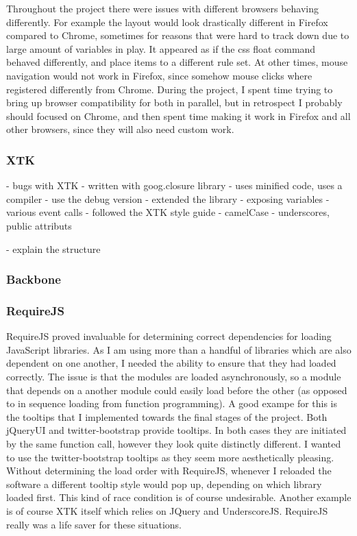 \documentclass[a4paper,11pt,titlepage]{article}
\begin{document}
Throughout the project there were issues with different browsers behaving differently. For example the layout would look drastically different in Firefox compared to Chrome, sometimes for reasons that were hard to track down due to large amount of variables in play. It appeared as if the css float command behaved differently, and place items to a different rule set. At other times, mouse navigation would not work in Firefox, since somehow mouse clicks where registered differently from Chrome. During the project, I spent time trying to bring up browser compatibility for both in parallel, but in retrospect I probably should focused on Chrome, and then spent time making it work in Firefox and all other browsers, since they will also need custom work.



\subsubsection{XTK}

- bugs with XTK
- written with goog.closure library
	- uses minified code, uses a compiler
	- use the debug version
- extended the library
- exposing variables
- various event calls
- followed the XTK style guide
	- camelCase
	- underscores, public attributs

- explain the structure




\subsubsection{Backbone}



\subsubsection{RequireJS}

RequireJS proved invaluable for determining correct dependencies for loading JavaScript libraries.
As I am using more than a handful of libraries which are also dependent on one another, I needed the ability to ensure that they had loaded correctly. The issue is that the modules are loaded asynchronously, so a module that depends on a another module could easily load before the other (as opposed to in sequence loading from function programming). A good exampe for this is the tooltips that I implemented towards the final stages of the project. Both jQueryUI and twitter-bootstrap provide tooltips. In both cases they are initiated by the same function call, however they look quite distinctly different. I wanted to use the twitter-bootstrap tooltips as they seem more aesthetically pleasing. Without determining the load order with RequireJS, whenever I reloaded the software a different tooltip style would pop up, depending on which library loaded first. This kind of race condition is of course undesirable.
Another example is of course XTK itself which relies on JQuery and UnderscoreJS. RequireJS really was a life saver for these situations.
\end{document}
